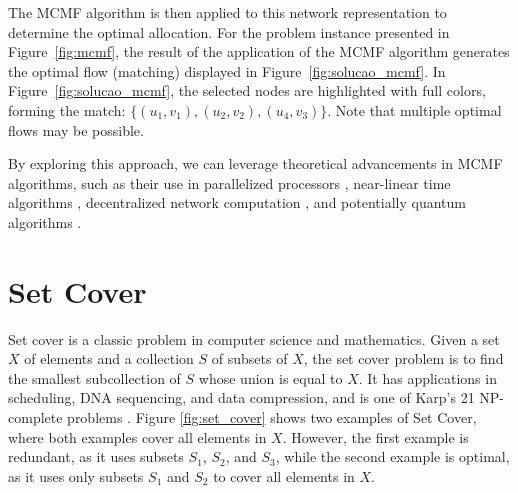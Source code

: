             The MCMF algorithm is then applied to this network representation to determine the optimal allocation. 
            For the problem instance presented in Figure~\ref{fig:mcmf}, the result of the application of the MCMF algorithm generates the optimal flow (matching) displayed in Figure~\ref{fig:solucao_mcmf}.
            In Figure~\ref{fig:solucao_mcmf}, the selected nodes are highlighted with full colors, forming the match: $\{(u_1, v_1), (u_2, v_2), (u_4, v_3)\}$.
            Note that multiple optimal flows may be possible.
            
            By exploring this approach, we can leverage theoretical advancements in MCMF algorithms, such as their use in parallelized processors \cite{akidau2013millwheel}, near-linear time algorithms \cite{9996881}, decentralized network computation \cite{alon2019decentralized}, and potentially quantum algorithms \cite{brandao2019quantum}.
             
        
    \section{Set Cover} \label{WSC}
    
        Set cover is a classic problem in computer science and mathematics. Given a set $X$ of elements and a collection $S$ of subsets of $X$, the set cover problem is to find the smallest subcollection of $S$ whose union is equal to $X$\cite{cormen, bondy1976graph}. It has applications in scheduling, DNA sequencing, and data compression, and is one of Karp's 21 NP-complete problems \cite{Karp1972}. 
        Figure \ref{fig:set_cover} shows two examples of Set Cover, where both examples cover all elements in $X$. However, the first example is redundant, as it uses subsets $S_1$, $S_2$, and $S_3$, while the second example is optimal, as it uses only subsets $S_1$ and $S_2$ to cover all elements in $X$.

